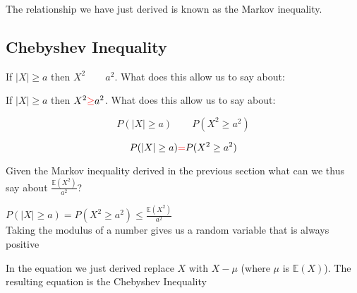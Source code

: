 \documentclass[paper=a4, fontsize=11pt]{scrartcl}
\newcommand{\red}[1]{{\color{red}#1}}
\numberwithin{equation}{section}
\numberwithin{figure}{section}
\numberwithin{table}{section}
\begin{document}
\noindent The relationship we have just derived is known as the Markov
inequality.

\subsection{Chebyshev Inequality}

\begin{questions}
\noindent If $|X| \ge a$ then $X^2 \qquad a^2$.  What does this allow us to say
about:
\end{questions}

\begin{answers}
\noindent If $|X| \ge a$ then $X^2 \red{\ge} a^2$.  What does this allow us to
say
about:
\end{answers}

\begin{questions}
\begin{equation}
 P(|X| \ge a) \qquad P(X^2 \ge a^2)
\end{equation}
\end{questions}

\begin{answers}
\begin{equation}
 P(|X| \ge a) \red{=} P(X^2 \ge a^2)
\end{equation}
\end{answers}

\noindent Given the Markov inequality derived in the previous section what can
we thus say about $\frac{\mathbb{E}(X^2)}{a^2}$?

\begin{questions}
\vspace{2cm}
\end{questions}

\begin{answers}
\vspace{0.25cm}
\red{ 
$P(|X| \ge a) = P(X^2 \ge a^2) \le \frac{\mathbb{E}(X^2)}{a^2}$ \\

Taking the modulus of a number gives us a random variable that is always
positive
}
\vspace{0.25cm}
\end{answers}

\noindent In the equation we just derived replace $X$ with $X-\mu$ (where $\mu$
is $\mathbb{E}(X)$).  The resulting equation is the Chebyshev Inequality 

\begin{questions}
\vspace{2cm}
\end{questions}
\end{document}
